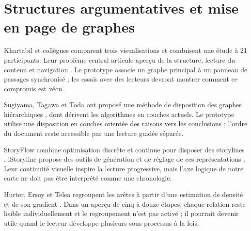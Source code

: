 \section{Structures argumentatives et mise en page de graphes}
Khartabil et collègues comparent trois visualisations et conduisent une étude à 21 participants. Leur problème central articule aperçu de la structure, lecture du contenu et navigation \cite{ref09}. Le prototype associe un graphe principal à un panneau de passages synchronisé ; les essais avec des lecteurs devront montrer comment ce compromis est vécu.

Sugiyama, Tagawa et Toda ont proposé une méthode de disposition des graphes hiérarchiques \cite{ref10}, dont dérivent les algorithmes en couches actuels. Le prototype utilise une disposition en couches orientée des raisons vers les conclusions ; l'ordre du document reste accessible par une lecture guidée séparée.

StoryFlow combine optimisation discrète et continue pour disposer des storylines \cite{ref11a}. iStoryline propose des outils de génération et de réglage de ces représentations \cite{ref11b}. Leur continuité visuelle inspire la lecture progressive, mais l'axe logique de notre carte ne doit pas être interprété comme une chronologie.

Hurter, Ersoy et Telea regroupent les arêtes à partir d'une estimation de densité et de son gradient \cite{ref12}. Dans un aperçu de cinq à douze étapes, chaque relation reste lisible individuellement et le regroupement n'est pas activé ; il pourrait devenir utile quand le lecteur développe plusieurs sous-processus à la fois.
